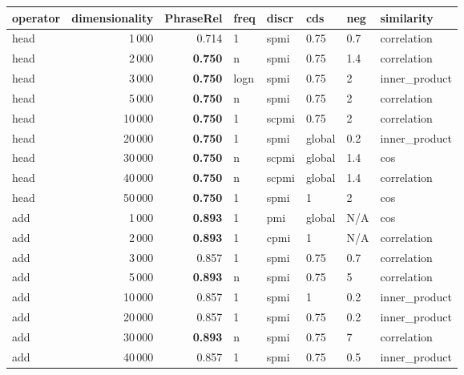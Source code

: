 \begin{tabular}{lrrlllll}
\toprule
operator &  dimensionality &  PhraseRel &  freq &  discr &     cds &  neg &     similarity \\
\midrule
    head &            1\,000 &      0.714 &     1 &   spmi &    0.75 &  0.7 &    correlation \\
    head &            2\,000 &      \textbf{0.750} &     n &   spmi &    0.75 &  1.4 &    correlation \\
    head &            3\,000 &      \textbf{0.750} &  logn &   spmi &    0.75 &    2 &  inner\_product \\
    head &            5\,000 &      \textbf{0.750} &     n &   spmi &    0.75 &    2 &    correlation \\
    head &           10\,000 &      \textbf{0.750} &     1 &  scpmi &    0.75 &    2 &    correlation \\
    head &           20\,000 &      \textbf{0.750} &     1 &   spmi &  global &  0.2 &  inner\_product \\
    head &           30\,000 &      \textbf{0.750} &     n &  scpmi &  global &  1.4 &            cos \\
    head &           40\,000 &      \textbf{0.750} &     n &  scpmi &  global &  1.4 &    correlation \\
    head &           50\,000 &      \textbf{0.750} &     1 &   spmi &       1 &    2 &            cos \\ \addlinespace
     add &            1\,000 &      \textbf{0.893} &     1 &    pmi &  global &  N/A &            cos \\
     add &            2\,000 &      \textbf{0.893} &     1 &   cpmi &       1 &  N/A &    correlation \\
     add &            3\,000 &      0.857 &     1 &   spmi &    0.75 &  0.7 &    correlation \\
     add &            5\,000 &      \textbf{0.893} &     n &   spmi &    0.75 &    5 &    correlation \\
     add &           10\,000 &      0.857 &     1 &   spmi &       1 &  0.2 &  inner\_product \\
     add &           20\,000 &      0.857 &     1 &   spmi &    0.75 &  0.2 &  inner\_product \\
     add &           30\,000 &      \textbf{0.893} &     n &   spmi &    0.75 &    7 &    correlation \\
     add &           40\,000 &      0.857 &     1 &   spmi &    0.75 &  0.5 &  inner\_product \\

\end{tabular}
